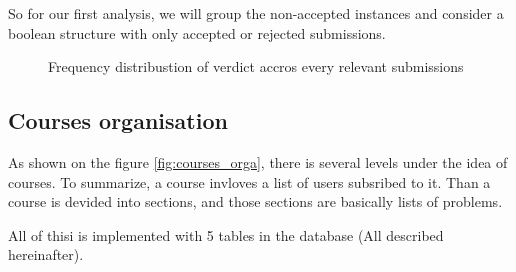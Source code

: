 \documentclass[../main.tex]{subfiles}
\begin{document}
So for our first analysis, we will group the non-accepted instances and consider a boolean structure with only accepted or rejected submissions.

\begin{figure}[h!]
\centering
{}
\caption[Verdict distribution]{Frequency distribustion of verdict accros every relevant submissions}
\label{fig:veredict_distrib}
\end{figure}






\subsection{Courses organisation} %
\label{sub:courses_organisation}

As shown on the figure \ref{fig:courses_orga}, there is several levels under the idea of courses.
To summarize, a course invloves a list of users subsribed to it. Than a course is devided into sections, and those sections are basically lists of problems.

All of thisi is implemented with 5 tables in the database (All described hereinafter).
\end{document}
